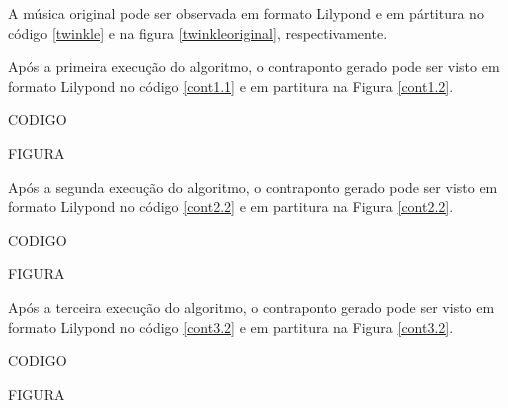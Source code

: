     A música original pode ser observada em formato Lilypond e em pártitura no código \ref{twinkle} e na figura \ref{twinkleoriginal}, respectivamente.

    Após a primeira execução do algoritmo, o contraponto gerado pode ser visto em formato Lilypond no código \ref{cont1.1} e em partitura na Figura \ref{cont1.2}.

    CODIGO

    FIGURA

    Após a segunda execução do algoritmo, o contraponto gerado pode ser visto em formato Lilypond no código \ref{cont2.2} e em partitura na Figura \ref{cont2.2}.

    CODIGO

    FIGURA

    Após a terceira execução do algoritmo, o contraponto gerado pode ser visto em formato Lilypond no código \ref{cont3.2} e em partitura na Figura \ref{cont3.2}.

    CODIGO

    FIGURA
